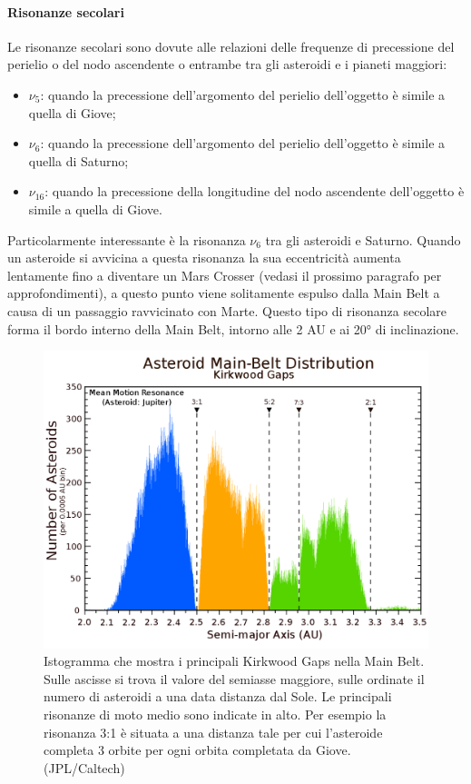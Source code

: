 \paragraph*{Risonanze secolari}
Le risonanze secolari sono dovute alle relazioni delle frequenze di precessione del perielio o del nodo ascendente o entrambe tra gli asteroidi e i pianeti maggiori:
\begin{itemize}
    \item $\nu_5$: quando la precessione dell'argomento del perielio dell'oggetto è simile a quella di Giove;
    \item $\nu_6$: quando la precessione dell'argomento del perielio dell'oggetto è simile a quella di Saturno;
    \item $\nu_{16}$: quando la precessione della longitudine del nodo ascendente dell'oggetto è simile a quella di Giove.
\end{itemize} 
Particolarmente interessante è la risonanza $\nu_6$ tra gli asteroidi e Saturno. Quando un asteroide si avvicina a questa risonanza la sua eccentricità aumenta lentamente fino a diventare un Mars Crosser (vedasi il prossimo paragrafo per approfondimenti), a questo punto viene solitamente espulso dalla Main Belt a causa di un passaggio ravvicinato con Marte. Questo tipo di risonanza secolare forma il bordo interno della Main Belt, intorno alle 2 AU e ai 20° di inclinazione.

\begin{figure}
    \centering
    \includegraphics[scale=0.24]{figure/jupiter_resonances.png}
    \caption[Risonanze di moto medio con Giove.]{Istogramma che mostra i principali Kirkwood Gaps nella Main Belt. Sulle ascisse si trova il valore del semiasse maggiore, sulle ordinate il numero di asteroidi a una data distanza dal Sole. Le principali risonanze di moto medio sono indicate in alto. Per esempio la risonanza 3:1 è situata a una distanza tale per cui l'asteroide completa 3 orbite per ogni orbita completata da Giove. (JPL/Caltech)}
    \label{fig:jupiter_resonances}
\end{figure}

